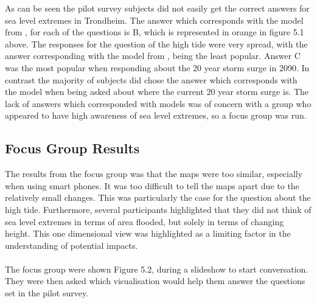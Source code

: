 As can be seen the pilot survey subjects did not easily get the correct answers for sea level extremes in Trondheim. The answer which corresponds with the model from \cite{kartverket_se_2020}, for each of the questions is B, which is represented in orange in figure 5.1 above. The responses for the question of the high tide were very spread, with the answer corresponding with the model from \cite{kartverket_se_2020}, being the least popular.  Answer C was the most popular when responding about the 20 year storm surge in 2090. In contrast the majority of subjects did chose the answer which corresponds with the model when being asked about where the current 20 year storm surge is. The lack of answers which corresponded with models was of concern with a group who appeared to have high awareness of sea level extremes, so a focus group was run. 
\paragraph{}


\subsection{Focus Group Results}
 The results from the focus group was that the maps were too similar, especially when using smart phones. It was too difficult to tell the maps apart due to the relatively small changes. This was particularly the case for the question about the high tide. Furthermore, several participants highlighted that they did not think of sea level extremes in terms of area flooded, but solely in terms of changing height. This one dimensional view was highlighted as a limiting factor in the understanding of potential impacts. 
\paragraph{}

The focus group were shown Figure 5.2, during a slideshow to start conversation. They were then asked which visualisation would help them answer the questions set in the pilot survey.
\paragraph{}

